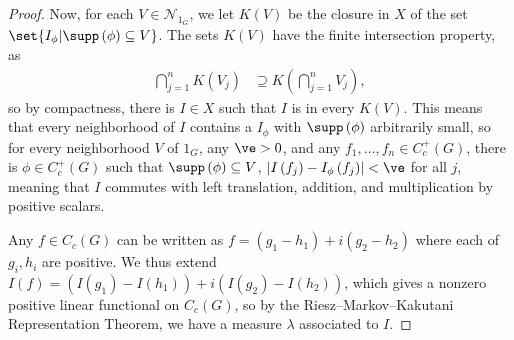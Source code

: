 \documentclass[10pt]{mypackage}
\begin{document}
\begin{proof}
  Now, for each $V\in \mathcal{N}_{1_G}$, we let $K(V)$ be the closure in $X$ of the set $\set{I_{\phi} | \supp\left( \phi \right)\subseteq V}$. The sets $K(V)$ have the finite intersection property, as
  \begin{align*}
    \bigcap_{j=1}^{n} K\left( V_j \right) &\supseteq K\left( \bigcap_{j=1}^{n}V_j \right),
  \end{align*}
  so by compactness, there is $I\in X$ such that $I$ is in every $K(V)$. This means that every neighborhood of $I$ contains a $I_{\phi}$ with $\supp\left( \phi \right)$ arbitrarily small, so for every neighborhood $V$ of $1_G$, any $\ve > 0$, and any $f_1,\dots,f_n\in C_c^{+}\left( G \right)$, there is $\phi\in C_c^{+}\left( G \right)$ such that $\supp\left( \phi \right)\subseteq V$, $\left\vert I\left( f_j \right) - I_{\phi}\left( f_j \right) \right\vert < \ve$ for all $j$, meaning that $I$ commutes with left translation, addition, and multiplication by positive scalars.\newline

  Any $f\in C_c(G)$ can be written as $f = \left( g_1-h_1 \right) + i\left( g_2-h_2 \right)$ where each of $g_i,h_i$ are positive. We thus extend $I(f) = \left( I\left( g_1 \right) - I\left( h_1 \right) \right) + i\left( I\left( g_2 \right)-I\left( h_2 \right) \right)$, which gives a nonzero positive linear functional on $C_c\left( G \right)$, so by the Riesz--Markov--Kakutani Representation Theorem, we have a measure $\lambda$ associated to $I$.
\end{proof}
\end{document}
